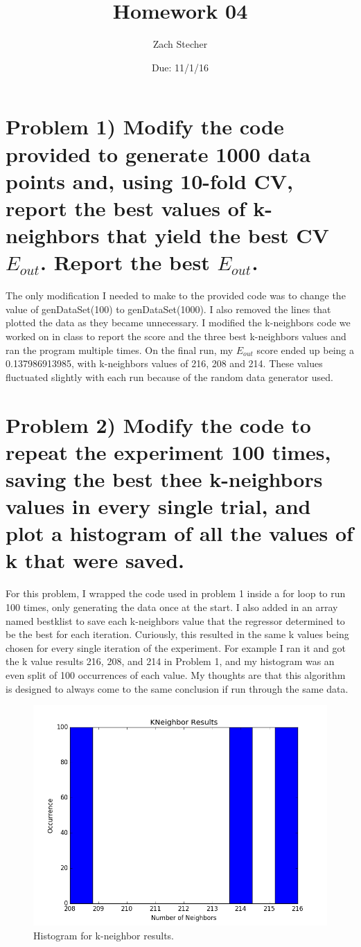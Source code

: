 \documentclass[11pt]{article}
\title{Homework 04}
\author{Zach Stecher}
\date{Due: 11/1/16}
\begin{document}
\maketitle

\section*{Problem 1) Modify the code provided to generate 1000 data points and, using 10-fold CV, report the best values of k-neighbors that yield the best CV $E_{out}$. Report the best $E_{out}$.}

The only modification I needed to make to the provided code was to change the value of genDataSet(100) to genDataSet(1000). I also removed the lines that plotted the data as they became unnecessary. I modified the k-neighbors code we worked on in class to report the score and the three best k-neighbors values and ran the program multiple times. On the final run, my $E_{out}$ score ended up being a 0.137986913985, with k-neighbors values of 216, 208 and 214. These values fluctuated slightly with each run because of the random data generator used.

\section*{Problem 2) Modify the code to repeat the experiment 100 times, saving the best thee k-neighbors values in every single trial, and plot a histogram of all the values of k that were saved.}

For this problem, I wrapped the code used in problem 1 inside a for loop to run 100 times, only generating the data once at the start. I also added in an array named bestklist to save each k-neighbors value that the regressor determined to be the best for each iteration. Curiously, this resulted in the same k values being chosen for every single iteration of the experiment. For example I ran it and got the k value results 216, 208, and 214 in Problem 1, and my histogram was an even split of 100 occurrences of each value. My thoughts are that this algorithm is designed to always come to the same conclusion if run through the same data.

\begin{figure}[!htb]
	\includegraphics[width=\linewidth]{kneighhistogram.png}
	\caption{Histogram for k-neighbor results.}
\end{figure}
\end{document}
